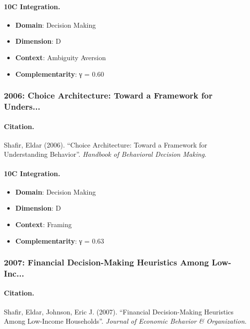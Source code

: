\paragraph{10C Integration.}
\begin{itemize}[nosep]
  \item \textbf{Domain}: Decision Making
  \item \textbf{Dimension}: D
  \item \textbf{Context}: Ambiguity Aversion
  \item \textbf{Complementarity}: γ = 0.60
\end{itemize}


\subsubsection{2006: Choice Architecture: Toward a Framework for Unders...}

\paragraph{Citation.}
Shafir, Eldar (2006). ``Choice Architecture: Toward a Framework for Understanding Behavior''. \textit{Handbook of Behavioral Decision Making}.

\paragraph{10C Integration.}
\begin{itemize}[nosep]
  \item \textbf{Domain}: Decision Making
  \item \textbf{Dimension}: D
  \item \textbf{Context}: Framing
  \item \textbf{Complementarity}: γ = 0.63
\end{itemize}


\subsubsection{2007: Financial Decision-Making Heuristics Among Low-Inc...}

\paragraph{Citation.}
Shafir, Eldar, Johnson, Eric J. (2007). ``Financial Decision-Making Heuristics Among Low-Income Households''. \textit{Journal of Economic Behavior & Organization}.


